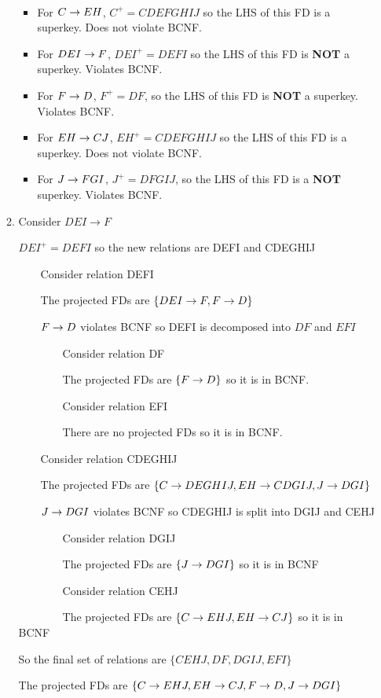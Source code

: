 \documentclass[boldsans]{article}
\begin{document}
\begin{enumerate}
\begin{enumerate}
        \
        
        \begin{itemize}
            \item For $C\rightarrow EH$, $C^+=CDEFGHIJ$ so the LHS of this FD is a superkey. Does not violate BCNF.
            \item For $DEI\rightarrow F$, $DEI^+=DEFI$ so the LHS of this FD is \textbf{NOT} a superkey. Violates BCNF.
            \item For $F\rightarrow D$, $F^+=DF$, so the LHS of this FD is \textbf{NOT} a superkey. Violates BCNF. 
            \item For $EH\rightarrow CJ$, $EH^+=CDEFGHIJ$ so the LHS of this FD is a superkey. Does not violate BCNF.
            \item  For $J\rightarrow FGI$, $J^+=DFGIJ$, so the LHS of this FD is a \textbf{NOT} superkey. Violates BCNF. 
        \end{itemize}
        \item
        Consider $DEI\rightarrow F$
        
        $DEI^+=DEFI$ so the new relations are 
        DEFI and CDEGHIJ
        
        \ \ \ \ Consider relation DEFI
        
        \ \ \ \ The projected FDs are $\{DEI\rightarrow F, F\rightarrow D\}$
        
        \ \ \ \ $F\rightarrow D$ violates BCNF so DEFI is decomposed into $DF$ and $EFI$
        
        \ \ \ \ \ \ \ \ Consider relation DF
        
        \ \ \ \ \ \ \ \ The projected FDs are $\{F\rightarrow D\}$ so it is in BCNF.
        
        \ \ \ \ \ \ \ \ Consider relation EFI
        
        \ \ \ \ \ \ \ \ There are no projected FDs so it is in BCNF.
        
        \ \ \ \ Consider relation CDEGHIJ
        
        \ \ \ \ The projected FDs are $\{C\rightarrow DEGHIJ, EH\rightarrow CDGIJ, J\rightarrow DGI\}$
        
        \ \ \ \ $J\rightarrow DGI$ violates BCNF so CDEGHIJ is split into DGIJ and CEHJ
        
        \ \ \ \ \ \ \ \ Consider relation DGIJ
        
        \ \ \ \ \ \ \ \ The projected FDs are $\{J\rightarrow DGI\}$ so it is in BCNF
        
        \ \ \ \ \ \ \ \ Consider relation CEHJ
        
        \ \ \ \ \ \ \ \ The projected FDs are $\{C\rightarrow EHJ, EH\rightarrow CJ\}$ so it is in BCNF
        
        So the final set of relations are $\{CEHJ, DF, DGIJ, EFI\}$
        
        
        The projected FDs are $\{C\rightarrow EHJ,  EH\rightarrow CJ, F\rightarrow D, J\rightarrow DGI\}$ 
    \end{enumerate}
\end{enumerate}
\end{document}
